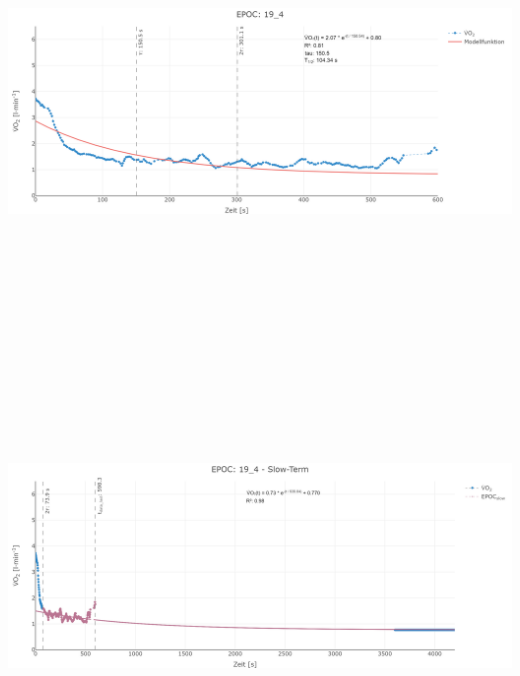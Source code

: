 \documentclass[
  letterpaper,
  DIV=11]{scrartcl}
\begin{document}
\includegraphics[width=11.45833in,height=4.6875in]{images/19_4_tau.png}
\includegraphics[width=11.45833in,height=4.6875in]{images/19_4_slow.png}
\end{document}
